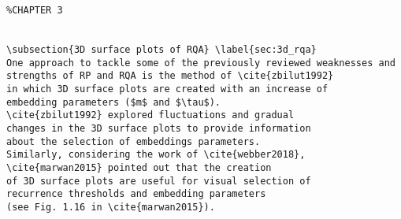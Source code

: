 \documentclass[12pt]{article}
\begin{document}
\begin{enumerate}
%
%


	\begin{verbatim}
%CHAPTER 3


\subsection{3D surface plots of RQA} \label{sec:3d_rqa}
One approach to tackle some of the previously reviewed weaknesses and 
strengths of RP and RQA is the method of \cite{zbilut1992} 
in which 3D surface plots are created with an increase of 
embedding parameters ($m$ and $\tau$). 
\cite{zbilut1992} explored fluctuations and gradual 
changes in the 3D surface plots to provide information 
about the selection of embeddings parameters. 
Similarly, considering the work of \cite{webber2018}, 
\cite{marwan2015} pointed out that the creation 
of 3D surface plots are useful for visual selection of 
recurrence thresholds and embedding parameters 
(see Fig. 1.16 in \cite{marwan2015}). 


\end{verbatim}
\end{enumerate}
\end{document}
